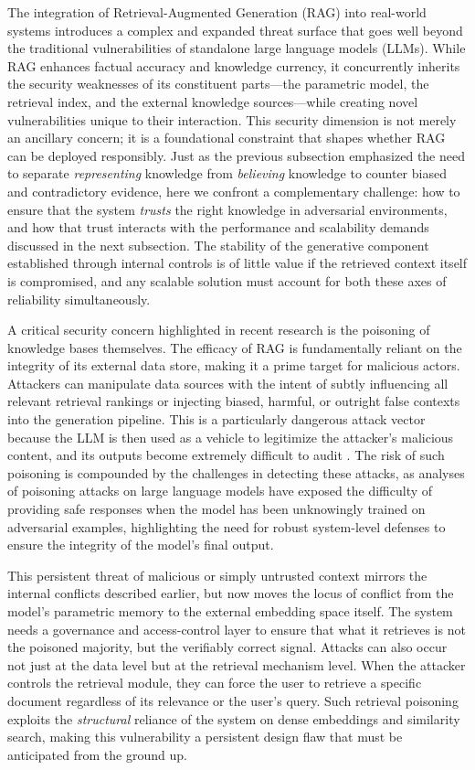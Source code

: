 \documentclass[11pt]{article}
\begin{document}
The integration of Retrieval-Augmented Generation (RAG) into real-world systems introduces a complex and expanded threat surface that goes well beyond the traditional vulnerabilities of standalone large language models (LLMs). While RAG enhances factual accuracy and knowledge currency, it concurrently inherits the security weaknesses of its constituent parts---the parametric model, the retrieval index, and the external knowledge sources---while creating novel vulnerabilities unique to their interaction. This security dimension is not merely an ancillary concern; it is a foundational constraint that shapes whether RAG can be deployed responsibly. Just as the previous subsection emphasized the need to separate \emph{representing} knowledge from \emph{believing} knowledge to counter biased and contradictory evidence, here we confront a complementary challenge: how to ensure that the system \emph{trusts} the right knowledge in adversarial environments, and how that trust interacts with the performance and scalability demands discussed in the next subsection. The stability of the generative component established through internal controls is of little value if the retrieved context itself is compromised, and any scalable solution must account for both these axes of reliability simultaneously.

A critical security concern highlighted in recent research is the poisoning of knowledge bases themselves. The efficacy of RAG is fundamentally reliant on the integrity of its external data store, making it a prime target for malicious actors. Attackers can manipulate data sources with the intent of subtly influencing all relevant retrieval rankings or injecting biased, harmful, or outright false contexts into the generation pipeline. This is a particularly dangerous attack vector because the LLM is then used as a vehicle to legitimize the attacker's malicious content, and its outputs become extremely difficult to audit \cite{ref441}. The risk of such poisoning is compounded by the challenges in detecting these attacks, as analyses of poisoning attacks on large language models have exposed the difficulty of providing safe responses when the model has been unknowingly trained on adversarial examples, highlighting the need for robust system-level defenses to ensure the integrity of the model's final output.

This persistent threat of malicious or simply untrusted context mirrors the internal conflicts described earlier, but now moves the locus of conflict from the model's parametric memory to the external embedding space itself. The system needs a governance and access-control layer to ensure that what it retrieves is not the poisoned majority, but the verifiably correct signal. Attacks can also occur not just at the data level but at the retrieval mechanism level. When the attacker controls the retrieval module, they can force the user to retrieve a specific document regardless of its relevance or the user's query. Such retrieval poisoning exploits the \emph{structural} reliance of the system on dense embeddings and similarity search, making this vulnerability a persistent design flaw that must be anticipated from the ground up.
\end{document}
